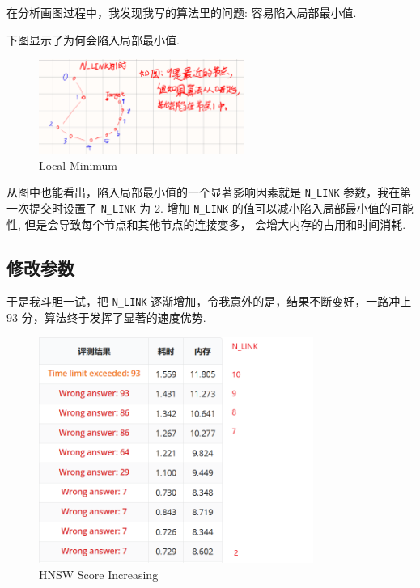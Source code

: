 在分析画图过程中，我发现我写的算法里的问题: 容易陷入局部最小值.

下图显示了为何会陷入局部最小值.

\begin{figure}[H]
    \centering
    \includegraphics[width=0.6\textwidth]{img/local-minimun}
    \caption{Local Minimum}
\end{figure}

从图中也能看出，陷入局部最小值的一个显著影响因素就是 \texttt{N\_LINK} 参数，我在第一次提交时设置了 \texttt{N\_LINK}
为 2.
增加 \texttt{N\_LINK} 的值可以减小陷入局部最小值的可能性, 但是会导致每个节点和其他节点的连接变多，
会增大内存的占用和时间消耗.

\subsection{修改参数}

于是我斗胆一试，把 \texttt{N\_LINK} 逐渐增加，令我意外的是，结果不断变好，一路冲上 93 分，算法终于发挥了显著的速度优势.

\begin{figure}[H]
    \centering
    \includegraphics[width=0.8\textwidth]{img/hnsw-score-increasing}
    \caption{HNSW Score Increasing}
\end{figure}

